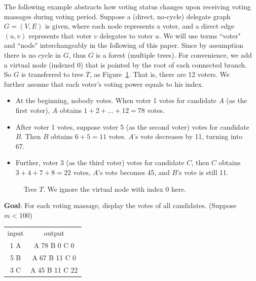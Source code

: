 The following example abstracts how voting status changes upon receiving voting massages during voting  period.
 Suppose a (direct, no-cycle) delegate graph $G=(V,E)$ is given, where each node represents a voter, and a direct edge $(u,v)$ represents that voter $v$ delegates to voter $u$. We will use terms ``voter" and ``node" interchangeably in the following of this paper.  Since by assumption there is no
cycle in $G$, thus $G$ is a forest (multiple trees). For convenience, we add a virtual node (indexed 0) that
is pointed by the root of each connected branch. So $G$ is transferred to tree $T$, as
Figure~\ref{fig:1}. That is, there are 12 voters. We further assume that each voter's voting power equals to his index. 

\begin{itemize}
\item At the beginning, nobody
votes. When voter 1 votes for candidate $A$ (as the first voter), $A$ obtains
$1+2+...+12=78$ votes.

\item After voter 1 votes, suppose voter 5 (as the second
voter) votes for candidate $B$. Then $B$ obtains $6+5=11$ votes. $A$'s vote
decreases by 11, turning into 67.

\item Further, voter 3 (as the third voter) votes for candidate $C$, then $C$
obtains $3+4+7+8=22$ votes, $A$'s vote becomes 45, and $B$'s vote is still 11.
\end{itemize}

\begin{figure}
  \centering
  
  	\caption{Tree $T$. We ignore the virtual node with index 0 here.}
  		\label{fig:1}
\end{figure}
\textbf{Goal}:
For each voting massage, display the votes of all candidates. (Suppose $m<100$)

\begin{tabular}{|c|c|}
input & output \\
1 A			&		A 78 B 0 C 0
\\
5 B			&		A 67 B 11 C 0
\\
3 C			&		A 45 B 11 C 22
\end{tabular}
